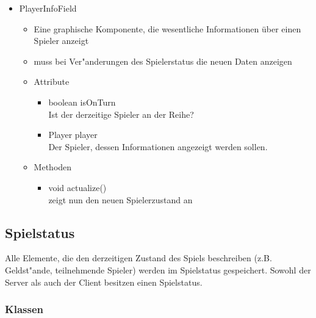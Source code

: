 \documentclass[a4paper,10pt]{article}
\begin{document}
\begin{itemize}
\item PlayerInfoField
\begin{itemize}
\item Eine graphische Komponente, die wesentliche Informationen über einen Spieler anzeigt
\item muss bei Ver"anderungen des Spielerstatus die neuen Daten anzeigen
\item Attribute
\begin{itemize}
\item boolean isOnTurn
\\Ist der derzeitige Spieler an der Reihe?
\item Player player
\\Der Spieler, dessen Informationen angezeigt werden sollen.
\end{itemize}
\item Methoden
\begin{itemize}
\item void actualize()
\\zeigt nun den neuen Spielerzustand an
\end{itemize}
\end{itemize}


\end{itemize}

\subsection{Spielstatus}


Alle Elemente, die den derzeitigen Zustand des Spiels beschreiben (z.B. Geldst"ande, teilnehmende Spieler) werden im Spielstatus gespeichert. Sowohl der Server als auch der Client besitzen einen Spielstatus.

\subsubsection{Klassen}
\end{document}

